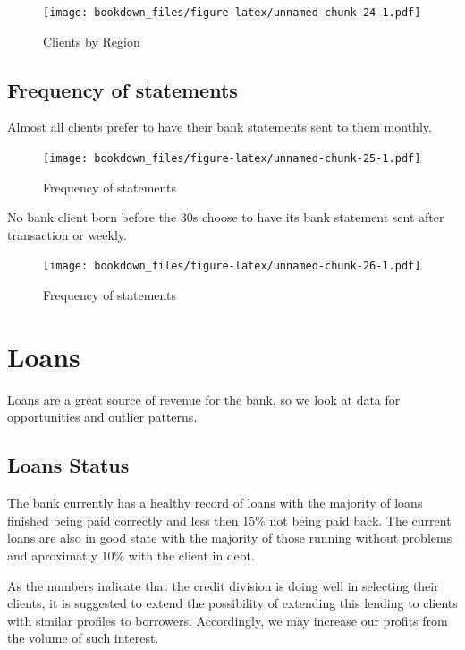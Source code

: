 \documentclass[]{book}
\begin{document}
\begin{figure}
\centering
\texttt{[image: bookdown\_files/figure-latex/unnamed-chunk-24-1.pdf]}
\caption{\label{fig:unnamed-chunk-24}Clients by Region}
\end{figure}

\section{Frequency of statements}\label{frequency-of-statements}

Almost all clients prefer to have their bank statements sent to them
monthly.

\begin{figure}
\centering
\texttt{[image: bookdown\_files/figure-latex/unnamed-chunk-25-1.pdf]}
\caption{\label{fig:unnamed-chunk-25}Frequency of statements}
\end{figure}

No bank client born before the 30s choose to have its bank statement
sent after transaction or weekly.

\begin{figure}
\centering
\texttt{[image: bookdown\_files/figure-latex/unnamed-chunk-26-1.pdf]}
\caption{\label{fig:unnamed-chunk-26}Frequency of statements}
\end{figure}

\chapter{Loans}\label{loans-1}

Loans are a great source of revenue for the bank, so we look at data for
opportunities and outlier patterns.

\section{Loans Status}\label{loans-status}

The bank currently has a healthy record of loans with the majority of
loans finished being paid correctly and less then 15\% not being paid
back. The current loans are also in good state with the majority of
those running without problems and aproximatly 10\% with the client in
debt.

As the numbers indicate that the credit division is doing well in
selecting their clients, it is suggested to extend the possibility of
extending this lending to clients with similar profiles to borrowers.
Accordingly, we may increase our profits from the volume of such
interest.
\end{document}

